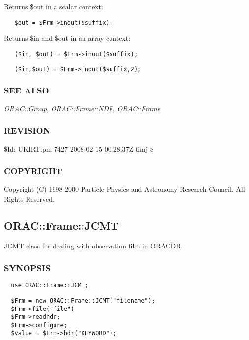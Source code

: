 \begin{description}
\begin{description}
Returns \$out in a scalar context:

\begin{verbatim}
   $out = $Frm->inout($suffix);
\end{verbatim}


Returns \$in and \$out in an array context:

\begin{verbatim}
   ($in, $out) = $Frm->inout($suffix);
\end{verbatim}
\begin{verbatim}
   ($in,$out) = $Frm->inout($suffix,2);
\end{verbatim}
\end{description}
\subsubsection*{SEE ALSO\label{ORAC::Frame::UKIRT_SEE_ALSO}}


\emph{ORAC::Group}, \emph{ORAC::Frame::NDF}, \emph{ORAC::Frame}

\subsubsection*{REVISION\label{ORAC::Frame::UKIRT_REVISION}}


\$Id: UKIRT.pm 7427 2008-02-15 00:28:37Z timj \$

\subsubsection*{COPYRIGHT\label{ORAC::Frame::UKIRT_COPYRIGHT}}


Copyright (C) 1998-2000 Particle Physics and Astronomy Research
Council. All Rights Reserved.

\subsection{ORAC::Frame::JCMT\label{ORAC::Frame::JCMT}}


JCMT class for dealing with observation files in ORACDR

\subsubsection*{SYNOPSIS\label{ORAC::Frame::JCMT_SYNOPSIS}}
\begin{verbatim}
  use ORAC::Frame::JCMT;
\end{verbatim}
\begin{verbatim}
  $Frm = new ORAC::Frame::JCMT("filename");
  $Frm->file("file")
  $Frm->readhdr;
  $Frm->configure;
  $value = $Frm->hdr("KEYWORD");
\end{verbatim}

\end{description}
